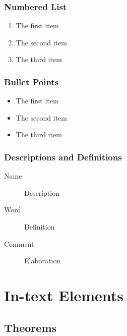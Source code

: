 \documentclass[11pt,fleqn,a5paper]{book} %
\begin{document}
    \subsection{Numbered List}
    
    \begin{enumerate}
    \item The first item
    \item The second item
    \item The third item
    \end{enumerate}
    
    \subsection{Bullet Points}
    
    \begin{itemize}
    \item The first item
    \item The second item
    \item The third item
    \end{itemize}
    
    \subsection{Descriptions and Definitions}
    
    \begin{description}
    \item[Name] Description
    \item[Word] Definition
    \item[Comment] Elaboration
    \end{description}
    
    
    \chapter{In-text Elements}
    
    \section{Theorems}
    
\end{document}
